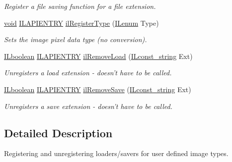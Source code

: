 \begin{DoxyCompactItemize}
\begin{DoxyCompactList}\small\item\em Register a file saving function for a file extension. \end{DoxyCompactList}\item 
\hyperlink{_i_l_8h_a5530e04d947bcddd83639ea7940faf10}{void} \hyperlink{_i_l_8h_a69c08a8d06df986f7e46f209d131ef2f}{I\+L\+A\+P\+I\+E\+N\+T\+R\+Y} \hyperlink{group__register_gac327753a4ba7fa0e4aa04ee8a351d619}{il\+Register\+Type} (\hyperlink{group__il__types_ga62ca73445716183ef42b1f3906a45ed0}{I\+Lenum} Type)
\begin{DoxyCompactList}\small\item\em Sets the image pixel data type (no conversion). \end{DoxyCompactList}\item 
\hyperlink{group__il__types_gaa6aa7c95cfdc06b4d8601ef832b7bb0a}{I\+Lboolean} \hyperlink{_i_l_8h_a69c08a8d06df986f7e46f209d131ef2f}{I\+L\+A\+P\+I\+E\+N\+T\+R\+Y} \hyperlink{group__register_ga388f0a90bbfee28bc2bebf0dd2b336e2}{il\+Remove\+Load} (\hyperlink{group__il__types_ga1aa1edc3eb344e14acacb02bade24a5a}{I\+Lconst\+\_\+string} Ext)
\begin{DoxyCompactList}\small\item\em Unregisters a load extension -\/ doesn't have to be called. \end{DoxyCompactList}\item 
\hyperlink{group__il__types_gaa6aa7c95cfdc06b4d8601ef832b7bb0a}{I\+Lboolean} \hyperlink{_i_l_8h_a69c08a8d06df986f7e46f209d131ef2f}{I\+L\+A\+P\+I\+E\+N\+T\+R\+Y} \hyperlink{group__register_gafbac37b1a3b743f6ef6f270de7e40c08}{il\+Remove\+Save} (\hyperlink{group__il__types_ga1aa1edc3eb344e14acacb02bade24a5a}{I\+Lconst\+\_\+string} Ext)
\begin{DoxyCompactList}\small\item\em Unregisters a save extension -\/ doesn't have to be called. \end{DoxyCompactList}\end{DoxyCompactItemize}


\subsection{Detailed Description}
Registering and unregistering loaders/savers for user defined image types. 



